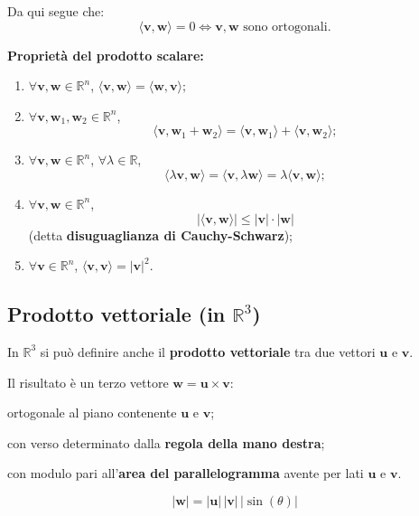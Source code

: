 Da qui segue che:
\[
\langle \mathbf{v}, \mathbf{w} \rangle = 0 \iff \mathbf{v}, \mathbf{w} \text{ sono ortogonali}.
\]

\textbf{Proprietà del prodotto scalare:}
\begin{enumerate}
    \item $\forall \mathbf{v}, \mathbf{w} \in \mathbb{R}^n$, $\langle \mathbf{v}, \mathbf{w} \rangle = \langle \mathbf{w}, \mathbf{v} \rangle$;
    \item $\forall \mathbf{v}, \mathbf{w}_1, \mathbf{w}_2 \in \mathbb{R}^n$, 
    \[
    \langle \mathbf{v}, \mathbf{w}_1 + \mathbf{w}_2 \rangle = \langle \mathbf{v}, \mathbf{w}_1 \rangle + \langle \mathbf{v}, \mathbf{w}_2 \rangle;
    \]
    \item $\forall \mathbf{v}, \mathbf{w} \in \mathbb{R}^n$, $\forall \lambda \in \mathbb{R}$,
    \[
    \langle \lambda \mathbf{v}, \mathbf{w} \rangle = \langle \mathbf{v}, \lambda \mathbf{w} \rangle = \lambda \langle \mathbf{v}, \mathbf{w} \rangle;
    \]
    \item $\forall \mathbf{v}, \mathbf{w} \in \mathbb{R}^n$, 
    \[
    |\langle \mathbf{v}, \mathbf{w} \rangle| \leq |\mathbf{v}| \cdot |\mathbf{w}|
    \]
    (detta \textbf{disuguaglianza di Cauchy-Schwarz});
    \item $\forall \mathbf{v} \in \mathbb{R}^n$, $\langle \mathbf{v}, \mathbf{v} \rangle = |\mathbf{v}|^2$.
\end{enumerate}


\subsection*{Prodotto vettoriale (in $\mathbb{R}^3$)}

In $\mathbb{R}^3$ si può definire anche il \textbf{prodotto vettoriale} tra due vettori $\mathbf{u}$ e $\mathbf{v}$.

Il risultato è un terzo vettore $\mathbf{w} = \mathbf{u} \times \mathbf{v}$:
\begin{compactitemize}
    \item ortogonale al piano contenente $\mathbf{u}$ e $\mathbf{v}$;
    \item con verso determinato dalla \textbf{regola della mano destra};
    \item con modulo pari all’\textbf{area del parallelogramma} avente per lati $\mathbf{u}$ e $\mathbf{v}$.
\end{compactitemize}

\[
|\mathbf{w}| = |\mathbf{u}| \, |\mathbf{v}| \, |\sin(\theta)|
\]

